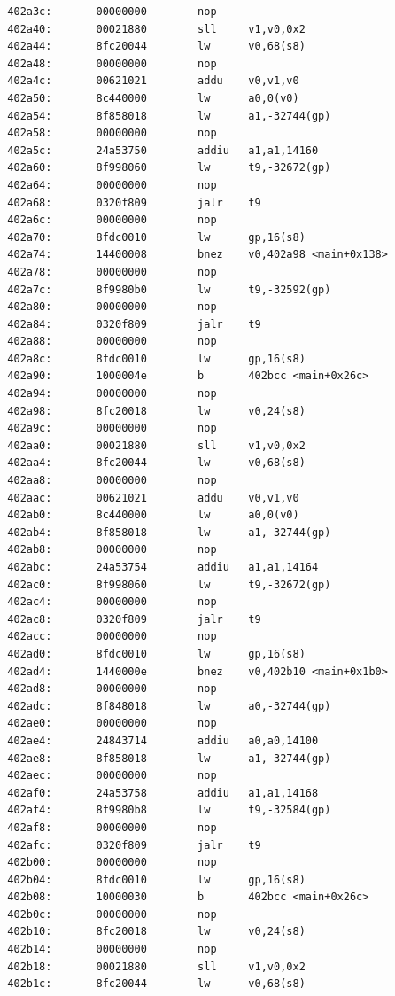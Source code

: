 \documentclass[11pt]{article}
\begin{document}
\begin{verbatim}
  402a3c:       00000000        nop
  402a40:       00021880        sll     v1,v0,0x2
  402a44:       8fc20044        lw      v0,68(s8)
  402a48:       00000000        nop
  402a4c:       00621021        addu    v0,v1,v0
  402a50:       8c440000        lw      a0,0(v0)
  402a54:       8f858018        lw      a1,-32744(gp)
  402a58:       00000000        nop
  402a5c:       24a53750        addiu   a1,a1,14160
  402a60:       8f998060        lw      t9,-32672(gp)
  402a64:       00000000        nop
  402a68:       0320f809        jalr    t9
  402a6c:       00000000        nop
  402a70:       8fdc0010        lw      gp,16(s8)
  402a74:       14400008        bnez    v0,402a98 <main+0x138>
  402a78:       00000000        nop
  402a7c:       8f9980b0        lw      t9,-32592(gp)
  402a80:       00000000        nop
  402a84:       0320f809        jalr    t9
  402a88:       00000000        nop
  402a8c:       8fdc0010        lw      gp,16(s8)
  402a90:       1000004e        b       402bcc <main+0x26c>
  402a94:       00000000        nop
  402a98:       8fc20018        lw      v0,24(s8)
  402a9c:       00000000        nop
  402aa0:       00021880        sll     v1,v0,0x2
  402aa4:       8fc20044        lw      v0,68(s8)
  402aa8:       00000000        nop
  402aac:       00621021        addu    v0,v1,v0
  402ab0:       8c440000        lw      a0,0(v0)
  402ab4:       8f858018        lw      a1,-32744(gp)
  402ab8:       00000000        nop
  402abc:       24a53754        addiu   a1,a1,14164
  402ac0:       8f998060        lw      t9,-32672(gp)
  402ac4:       00000000        nop
  402ac8:       0320f809        jalr    t9
  402acc:       00000000        nop
  402ad0:       8fdc0010        lw      gp,16(s8)
  402ad4:       1440000e        bnez    v0,402b10 <main+0x1b0>
  402ad8:       00000000        nop
  402adc:       8f848018        lw      a0,-32744(gp)
  402ae0:       00000000        nop
  402ae4:       24843714        addiu   a0,a0,14100
  402ae8:       8f858018        lw      a1,-32744(gp)
  402aec:       00000000        nop
  402af0:       24a53758        addiu   a1,a1,14168
  402af4:       8f9980b8        lw      t9,-32584(gp)
  402af8:       00000000        nop
  402afc:       0320f809        jalr    t9
  402b00:       00000000        nop
  402b04:       8fdc0010        lw      gp,16(s8)
  402b08:       10000030        b       402bcc <main+0x26c>
  402b0c:       00000000        nop
  402b10:       8fc20018        lw      v0,24(s8)
  402b14:       00000000        nop
  402b18:       00021880        sll     v1,v0,0x2
  402b1c:       8fc20044        lw      v0,68(s8)

\end{verbatim}
\end{document}

